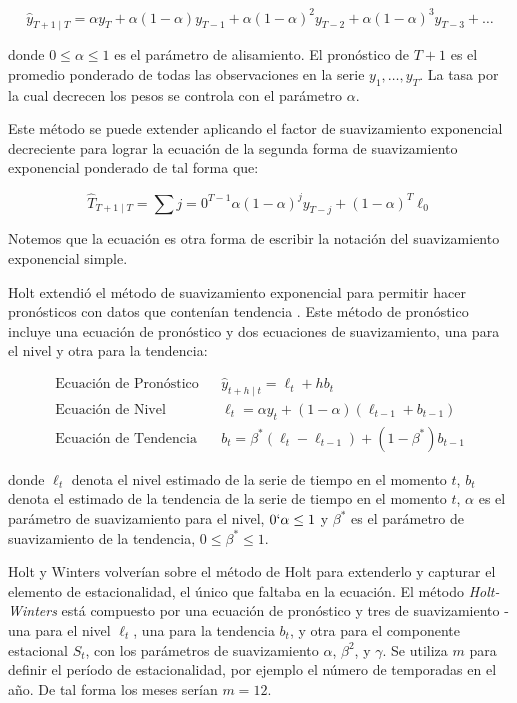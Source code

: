 \begin{spacing}{1.5}
\[ \hat{y}_{T+1 \mid T} = \alpha y_{T} + \alpha(1-\alpha) y_{T-1} + \alpha(1-\alpha)^2 y_{T-2} + \alpha(1-\alpha)^3 y_{T-3} + \ldots \]

donde $0 \leq \alpha \leq 1$ es el parámetro de alisamiento. El pronóstico de $T + 1$ es el promedio ponderado de todas las observaciones en la serie $y_1, \ldots, y_T$. La tasa por la cual decrecen los pesos se controla con el parámetro $\alpha$.

Este método se puede extender aplicando el factor de suavizamiento exponencial decreciente para lograr la ecuación de la segunda forma de suavizamiento exponencial ponderado de tal forma que:

\[ \hat{T}_{T+1 \mid T} = \sum{j=0}^{T-1} \alpha(1-\alpha)^j y_{T-j} + (1-\alpha)^{T} \ell_{0}  \]

Notemos que la ecuación es otra forma de escribir la notación del suavizamiento exponencial simple. 

Holt extendió el método de suavizamiento exponencial para permitir hacer pronósticos con datos que contenían tendencia \cite{hyndman}. Este método de pronóstico incluye una ecuación de pronóstico y dos ecuaciones de suavizamiento, una para el nivel y otra para la tendencia:

\begin{eqnarray*}
	\text{Ecuación de Pronóstico}&&\hat{y}_{t+h \mid t} = \ell_{t} + hb_{t} \\
	\text{Ecuación de Nivel}&&\ell_{t} = \alpha y_{t} + (1 - \alpha)(\ell_{t-1} + b_{t-1}) \\
	\text{Ecuación de Tendencia}&&b_{t} = \beta^{*}(\ell_{t} - \ell_{t-1}) + (1 - \beta^{*})b_{t-1}  
\end{eqnarray*}

donde $\ell_{t}$ denota el nivel estimado de la serie de tiempo en el momento $t$, $b_{t}$ denota el estimado de la tendencia de la serie de tiempo en el momento $t$, $\alpha$ es el parámetro de suavizamiento para el nivel, $0 \lq \alpha \leq 1$ y $\beta^{*}$ es el parámetro de suavizamiento de la tendencia, $0 \leq \beta^{*} \leq 1$.

Holt y Winters volverían sobre el método de Holt para extenderlo y capturar el elemento de estacionalidad, el único que faltaba en la ecuación. El método \emph{Holt-Winters} está compuesto por una ecuación de pronóstico y tres de suavizamiento - una para el nivel $\ell_{t}$, una para la tendencia $b_{t}$, y otra para el componente estacional $S_t$, con los parámetros de suavizamiento $\alpha$, $\beta^{2}$, y $\gamma$. Se utiliza $m$ para definir el período de estacionalidad, por ejemplo el número de temporadas en el año. De tal forma los meses serían $m=12$. 


\end{spacing}
